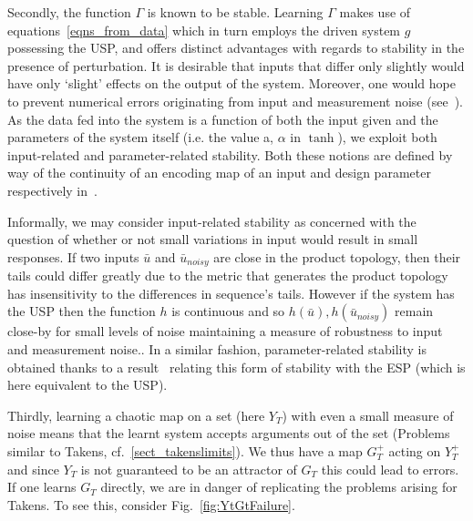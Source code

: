 Secondly, the function $\Gamma$ is known to be stable. Learning $\Gamma$ makes use of equations~\ref{eqns_from_data} which in turn employs the driven system $g$ possessing the USP, and offers distinct advantages with regards to stability in the presence of perturbation. It is desirable that inputs that differ only slightly would have only ‘slight’ effects on the output of the system. Moreover, one would hope to prevent numerical errors originating from input and measurement noise (see~\cite[Th. 5]{manjunath2021universal}). 
As the data fed into the system is a function of both the input given and the parameters of the system itself (i.e. the value a, $\alpha$ in $\tanh$), we exploit both input-related and parameter-related stability. Both these notions are defined by way of the continuity of an encoding map of an input and design parameter respectively in~\cite{manjunath2020stability}.

Informally, we may consider input-related stability as concerned with the question of whether or not small variations in input would result in small responses.   
If two inputs $\bar{u}$ and $\bar{u}_{noisy}$ are close in the product topology, then their tails could differ greatly due to the metric that generates the product topology has insensitivity to the differences in sequence's tails.
 However if the system has the USP then the function $h$ is continuous and so $h(\bar{u}), h(\bar{u}_{noisy})$ remain close-by for small levels of noise maintaining a measure of robustness to input and measurement noise.\cite{manjunath2021universal}.
In a similar fashion, parameter-related stability is obtained thanks to a result~\cite[Lemma 3.2]{manjunath2020stability} relating this form of stability with the ESP (which is here equivalent to the USP).



Thirdly, learning a chaotic map on a set (here $Y_T$) with even a small measure of noise  means that the learnt system accepts arguments out of the set (Problems similar to Takens, cf.~\ref{sect_takenslimits}). 
We thus have a map $G_T^+$ acting on $Y_T^+$ and since $Y_T$ is not guaranteed to be an attractor of $G_T$ this could lead to errors.
If one learns $G_T$ directly, we are in danger of replicating the problems arising for Takens.  To see this, consider Fig.~\ref{fig:YtGtFailure}.

